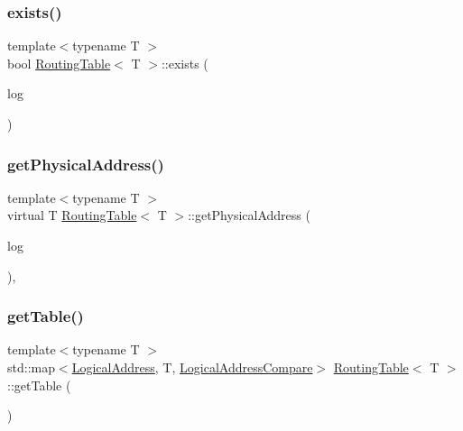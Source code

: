 \subsubsection{\texorpdfstring{exists()}{exists()}}
{\footnotesize\ttfamily template$<$typename T $>$ \\
bool \hyperlink{classRoutingTable}{Routing\+Table}$<$ T $>$\+::exists (\begin{DoxyParamCaption}\item[{\hyperlink{structLogicalAddress}{Logical\+Address}}]{log }\end{DoxyParamCaption})\hspace{0.3cm}{\ttfamily [inline]}}

\mbox{\label{classRoutingTable_ae55b8c9ac65251bdc462a81076f7a500}} 
\subsubsection{\texorpdfstring{get\+Physical\+Address()}{getPhysicalAddress()}}
{\footnotesize\ttfamily template$<$typename T $>$ \\
virtual T \hyperlink{classRoutingTable}{Routing\+Table}$<$ T $>$\+::get\+Physical\+Address (\begin{DoxyParamCaption}\item[{\hyperlink{structLogicalAddress}{Logical\+Address}}]{log }\end{DoxyParamCaption})\hspace{0.3cm}{\ttfamily [inline]}, {\ttfamily [virtual]}}

\mbox{\label{classRoutingTable_ad3786a2950ae5efb9cfe87449cc895e1}} 
\subsubsection{\texorpdfstring{get\+Table()}{getTable()}}
{\footnotesize\ttfamily template$<$typename T $>$ \\
std\+::map$<$\hyperlink{structLogicalAddress}{Logical\+Address}, T, \hyperlink{structLogicalAddressCompare}{Logical\+Address\+Compare}$>$ \hyperlink{classRoutingTable}{Routing\+Table}$<$ T $>$\+::get\+Table (\begin{DoxyParamCaption}{ }\end{DoxyParamCaption})\hspace{0.3cm}{\ttfamily [inline]}}

